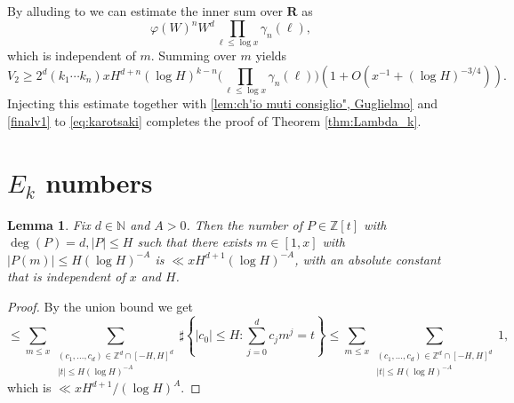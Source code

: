 \documentclass[reqno, 11pt]{amsart}
\numberwithin{equation}{section}
\newtheorem{lemma}[theorem]{Lemma}
\theoremstyle{definition}
\renewcommand{\phi}{\varphi}
\newcommand{\0}{\mathbf{0}}
\renewcommand{\leq}{\leqslant}
\renewcommand{\geq}{\geqslant}
\newcommand{\Z}{\mathbb{Z}}
\renewcommand{\leq}{\leqslant}
\renewcommand{\geq}{\geqslant}
\renewcommand{\#}{\sharp}
\begin{document}
By alluding to  \cite[Lemma 2.7]{MR4542704} we can estimate the inner sum over $\mathbf R$  as 
$$\phi(W)^n W^d \prod_{\ell \leq \log x } \gamma_n(\ell),$$ which is independent of $m$.
Summing over $m$ yields  $$ V_2\geq  2^d (k_1\cdots k_n)  x H^{d+n} 
( \log H)^{k-n}   \Big(\prod_{\ell \leq \log x } \gamma_n(\ell) \Big)
(1+O( x^{-1}+(\log H)^{-3/4}))  .$$  Injecting this estimate together with 
\eqref{lem:ch'io muti consiglio", Guglielmo} and \eqref{finalv1} to \eqref{eq:karotsaki} 
completes the proof of Theorem \ref{thm:Lambda_k}.

 

\section{$E_k$ numbers}


\begin{lemma}
\label{lem:ABC}Fix $d\in \mathbb N$ and $A>0$. 
Then the number of $P\in \Z[t]$ with $\deg(P)=d,|P|\leq H$ such that there exists $m\in [1,x]$ with $|P(m)|\leq H (\log H)^{-A}$ is 
$\ll x H^{d+1} (\log H)^{-A}$, with an absolute constant that is independent of $x$ and $H$.
\end{lemma}\begin{proof}By the union bound we get 
\[ \leq \sum_{m\leq x} \sum_{\substack{ (c_1,\ldots, c_d)
\in \Z^d\cap[-H,H]^d\\ |t| \leq H (\log H)^{-A} }}\#\left\{|c_0|\leq H: \sum_{j=0}^d c_j m^j =t\right\} \leq\sum_{m\leq x} \sum_{\substack{ (c_1,\ldots, c_d)
\in \Z^d\cap[-H,H]^d\\ |t| \leq H (\log H)^{-A} }} 1 ,\] which is 
$\ll xH^{d+1}/(\log H)^A$. 
\end{proof}
\end{document}
